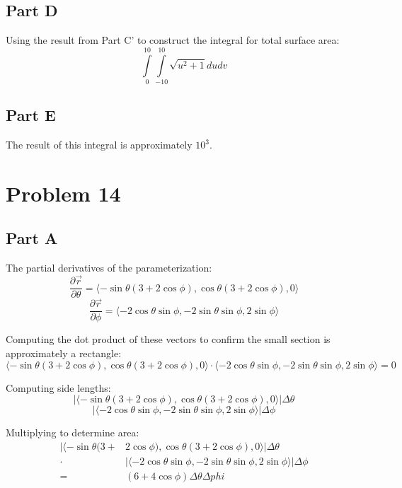 \documentclass{article}
\begin{document}
\subsection*{Part D}

Using the result from Part C' to construct the integral for total surface area:
$$ \int\limits_0^{10} \int\limits_{-10}^{10} \sqrt{u^2 + 1} du dv $$

\subsection*{Part E}

The result of this integral is approximately $10^3$.

\section*{Problem 14}

\subsection*{Part A}

The partial derivatives of the parameterization:
$$ \frac{\partial \vec{r}}{\partial \theta} = \langle - \sin \theta (3 + 2 \cos
\phi), \cos \theta (3 + 2 \cos \phi), 0 \rangle $$
$$ \frac{\partial \vec{r}}{\partial \phi} = \langle -2 \cos \theta \sin \phi, -2
\sin \theta \sin \phi, 2 \sin \phi \rangle $$

Computing the dot product of these vectors to confirm the small section is
approximately a rectangle:
$$ \langle - \sin \theta (3 + 2 \cos \phi), \cos \theta (3 + 2 \cos \phi), 0
\rangle \cdot  \langle -2 \cos \theta \sin \phi, -2 \sin \theta \sin \phi, 2 \sin
\phi \rangle = 0 $$

Computing side lengths:
$$  \vert \langle - \sin \theta (3 + 2 \cos \phi), \cos \theta (3 + 2 \cos \phi), 0
\rangle \vert \Delta \theta $$
$$ \vert \langle -2 \cos \theta \sin \phi, -2 \sin \theta \sin \phi, 2 \sin \phi
\rangle \vert \Delta \phi $$

Multiplying to determine area:
\begin{equation*}
  \begin{split}
    \vert \langle - \sin \theta (3 + &2 \cos \phi), \cos \theta (3 + 2 \cos
    \phi), 0 \rangle \vert \Delta \theta \\ \cdot & \vert \langle -2 \cos \theta \sin
    \phi, -2 \sin \theta \sin \phi, 2 \sin \phi \rangle \vert \Delta \phi \\ = & (6 +
    4 \cos \phi) \Delta \theta \Delta phi
  \end{split}
\end{equation*}
\end{document}
